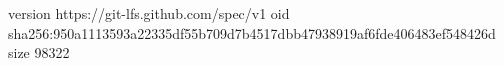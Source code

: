 version https://git-lfs.github.com/spec/v1
oid sha256:950a1113593a22335df55b709d7b4517dbb47938919af6fde406483ef548426d
size 98322
